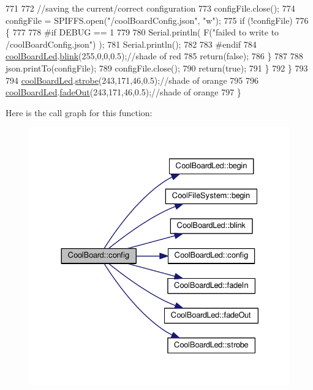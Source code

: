 \begin{DoxyCode}
771 
772             \textcolor{comment}{//saving the current/correct configuration}
773             configFile.close();
774             configFile = SPIFFS.open(\textcolor{stringliteral}{"/coolBoardConfig.json"}, \textcolor{stringliteral}{"w"});
775             \textcolor{keywordflow}{if} (!configFile)
776             \{
777             
778 \textcolor{preprocessor}{            #if DEBUG == 1}
779 
780                 Serial.println( F(\textcolor{stringliteral}{"failed to write to /coolBoardConfig.json"}) );
781                 Serial.println();
782             
783 \textcolor{preprocessor}{            #endif}
784                 \hyperlink{classCoolBoard_a1b1d3c684a5baa56b08486e192fd8e97}{coolBoardLed}.\hyperlink{classCoolBoardLed_a96e1ea13003eee34c9dbcef340404426}{blink}(255,0,0,0.5);\textcolor{comment}{//shade of red     }
785                 \textcolor{keywordflow}{return}(\textcolor{keyword}{false});
786             \}
787 
788             json.printTo(configFile);
789             configFile.close();
790             \textcolor{keywordflow}{return}(\textcolor{keyword}{true});
791         \}
792     \}
793 
794     \hyperlink{classCoolBoard_a1b1d3c684a5baa56b08486e192fd8e97}{coolBoardLed}.\hyperlink{classCoolBoardLed_ad5f0de4c628cbfbf49896042831c64ad}{strobe}(243,171,46,0.5);\textcolor{comment}{//shade of orange}
795     
796     \hyperlink{classCoolBoard_a1b1d3c684a5baa56b08486e192fd8e97}{coolBoardLed}.\hyperlink{classCoolBoardLed_a93d545679237e8cc858324367149775c}{fadeOut}(243,171,46,0.5);\textcolor{comment}{//shade of orange               }
797 \}
\end{DoxyCode}
Here is the call graph for this function\+:
\nopagebreak
\begin{figure}[H]
\begin{center}
\leavevmode
\includegraphics[width=330pt]{classCoolBoard_a583a874c09c07e70a6eb9229fc4beddb_cgraph}
\end{center}
\end{figure}
\mbox{\label{classCoolBoard_a519de78b807f8ec6463ff484eb925918}} 
